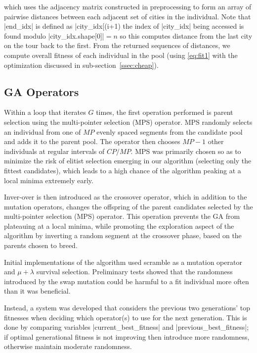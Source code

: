 {\small}

\noindent which uses the adjacency matrix constructed in preprocessing to form 
an array of pairwise distances between each adjacent set of cities in the 
individual. Note that |end_idx| is defined as |city_idx[(i+1) %
\ie the index of |city_idx| being accessed is found modulo 
|city_idx.shape[0]|${} = n$ so this computes distance from the last city on the 
tour back to the first. From the returned sequences of distances, we 
compute overall fitness of each individual in the pool (using \eqref{eq:fit1}
with the optimization discussed in sub-section~\ref{ssec:cheap}).

\subsection{GA Operators}
Within a loop that iterates $G$ times, the first operation performed is parent
selection using the multi-pointer selection (MPS) operator. MPS randomly 
selects an individual from one of $MP$ evenly spaced segments from the 
candidate pool and adds it to the parent pool. The operator then chooses
$MP-1$ other individuals at regular intervals of $CP/MP$. MPS was primarily 
chosen so as to minimize the risk of elitist selection emerging in our 
algorithm (\ie selecting only the fittest candidates), which leads to a 
high chance of the algorithm peaking at a local minima extremely early.

Inver-over is then introduced as the crossover operator, which in addition 
to the mutation operators, changes the offspring of the parent candidates 
selected by the multi-pointer selection (MPS) operator. This operation prevents
 the GA from plateauing at a local minima, while promoting the exploration 
aspect of the algorithm by inverting a random segment at the crossover phase, 
based on the parents chosen to breed.

Initial implementations of the algorithm used scramble as a mutation operator
and $\mu + \lambda$ survival selection. Preliminary tests showed that the 
randomness introduced by the swap mutation could be harmful to a fit 
individual more often than it was beneficial.  

Instead, a system was developed that considers the previous two generations'
top fitnesses when deciding which operator(s) to use for the next generation.
This is done by comparing variables |current_best_fitness| and 
|previous_best_fitness|; if optimal generational fitness is not improving
then introduce more randomness, otherwise maintain moderate randomness.

